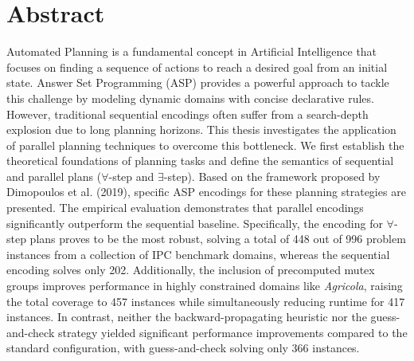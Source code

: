 \documentclass[
     11pt,                    %
     a4paper,             %
     BCOR=10mm,     %
     DIV=14,                 %
     listof=totoc,                    %
     bibliography=totoc,       %
     index=totoc,              %
     parskip            %
     twoside,
     headsepline
     ]{scrreprt}
\theoremstyle{definition}
\theoremstyle{definition}
\theoremstyle{remark}
\theoremstyle{bfnote}
\begin{document}
\chapter*{Abstract}
Automated Planning is a fundamental concept in Artificial Intelligence that focuses on finding a sequence of actions to reach a desired goal from an initial state. Answer Set Programming (ASP) provides a powerful approach to tackle this challenge by modeling dynamic domains with concise declarative rules. However, traditional sequential encodings often suffer from a \mbox{search-depth} explosion due to long planning horizons. This thesis investigates the application of parallel planning techniques to overcome this bottleneck.
We first establish the theoretical foundations of planning tasks and define the semantics of sequential and parallel plans ($\forall$-step and $\exists$-step). Based on the framework proposed by Dimopoulos et al. (2019), specific ASP encodings for these planning strategies are presented.
The empirical evaluation demonstrates that parallel encodings significantly outperform the sequential baseline. Specifically, the encoding for $\forall$-step plans proves to be the most robust, solving a total of 448 out of 996 problem instances from a collection of IPC benchmark domains, whereas the sequential encoding solves only 202. Additionally, the inclusion of precomputed mutex groups improves performance in highly constrained domains like \textit{Agricola}, raising the total coverage to 457 instances while simultaneously reducing runtime for 417 instances. In contrast, neither the backward-propagating heuristic nor the guess-and-check strategy yielded significant performance improvements compared to the standard configuration, with guess-and-check solving only 366 instances.
\end{document}
